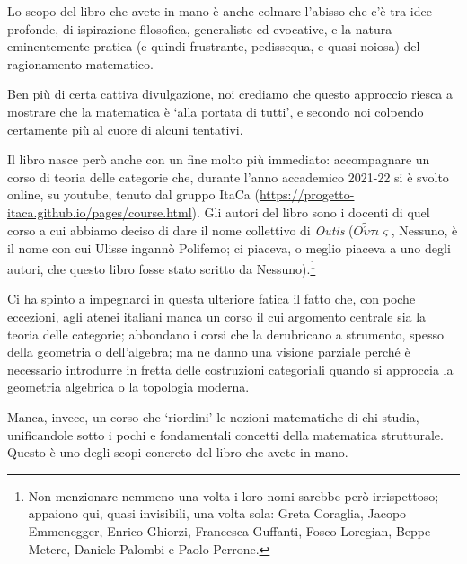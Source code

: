 \medskip
Lo scopo del libro che avete in mano è anche colmare l'abisso che c'è tra idee profonde, di ispirazione filosofica, generaliste ed evocative, e la natura eminentemente pratica (e quindi frustrante, pedissequa, e quasi noiosa) del ragionamento matematico.

Ben più di certa cattiva divulgazione, noi crediamo che questo approccio riesca a mostrare che la matematica è `alla portata di tutti', e secondo noi colpendo certamente più al cuore di alcuni tentativi.

\medskip
Il libro nasce però anche con un fine molto più immediato: accompagnare un corso di teoria delle categorie che, durante l'anno accademico 2021-22 si è svolto online, su youtube, tenuto dal gruppo ItaCa (\url{https://progetto-itaca.github.io/pages/course.html}). Gli autori del libro sono i docenti di quel corso a cui abbiamo deciso di dare il nome collettivo di \emph{Outis} (\(O\tilde{\acute\upsilon}\tau\iota\varsigma\), Nessuno, è il nome con cui Ulisse ingannò Polifemo; ci piaceva, o meglio piaceva a uno degli autori, che questo libro fosse stato scritto da Nessuno).\footnote{Non menzionare nemmeno una volta i loro nomi sarebbe però irrispettoso; appaiono qui, quasi invisibili, una volta sola:
	Greta Coraglia, Jacopo Emmenegger, Enrico Ghiorzi, Francesca Guffanti, Fosco Loregian, Beppe Metere, Daniele Palombi e Paolo Perrone.}

Ci ha spinto a impegnarci in questa ulteriore fatica il fatto che, con poche eccezioni, agli atenei italiani manca un corso il cui argomento centrale sia la teoria delle categorie; abbondano i corsi che la derubricano a strumento, spesso della geometria o dell'algebra; ma ne danno una visione parziale perché è necessario introdurre in fretta delle costruzioni categoriali quando si approccia la geometria algebrica o la topologia moderna.

Manca, invece, un corso che `riordini' le nozioni matematiche di chi studia, unificandole sotto i pochi e fondamentali concetti della matematica strutturale. Questo è uno degli scopi concreto del libro che avete in mano.

